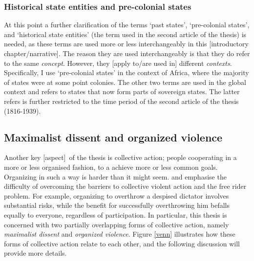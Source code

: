 \documentclass[12pt]{article}
\begin{document}
\subsubsection{Historical state entities and pre-colonial states} 
\label{Historical state entities and Pre-colonial states}

At this point a further clarification of the terms `past states',
`pre-colonial states', and `historical state entities' (the term used in the
second article of the thesis) is needed, as these terms are used more or less
interchangeably in this [introductory chapter/narrative]. The reason they are
used interchangeably is that they do refer to the same \textit{concept}.
However, they [apply to/are used in] different \textit{contexts}. Specifically,
I use `pre-colonial states' in the context of Africa, where the majority of
states were at some point colonies. The other two terms are used in the global
context and refers to states that now form parts of sovereign states. The latter
refers is further restricted to the time period of the second article of the
thesis (1816-1939).

\subsection{Maximalist dissent and organized violence}
\label{Maximalist dissent and organized violence}


Another key [aspect] of the thesis is collective action; people cooperating in a
more or less organised fashion, to a achieve more or less common goals.
Organizing in such a way is harder than it might seem.
\citet{OlsonMancur1965TLoC} and \citet{Tullock_1971} emphasise the difficulty of
overcoming the barriers to collective violent action and the free rider problem.
For example, organizing to overthrow a despised dictator involves substantial
risks, while the benefit for successfully overthrowing him befalls equally to
everyone, regardless of participation. In particular, this thesis is concerned
with two partially overlapping forms of collective action, namely
\textit{maximalist dissent} and \textit{organized violence}. Figure \ref{venn}
illustrates how these forms of collective action relate to each other, and the
following discussion will provide more details.
\end{document}
